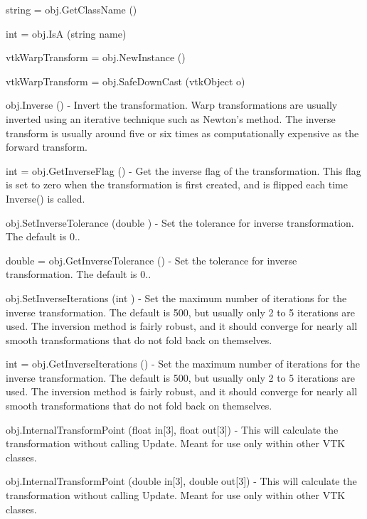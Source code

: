 \begin{DoxyItemize}
\item {\ttfamily string = obj.\-Get\-Class\-Name ()}  
\item {\ttfamily int = obj.\-Is\-A (string name)}  
\item {\ttfamily vtk\-Warp\-Transform = obj.\-New\-Instance ()}  
\item {\ttfamily vtk\-Warp\-Transform = obj.\-Safe\-Down\-Cast (vtk\-Object o)}  
\item {\ttfamily obj.\-Inverse ()} -\/ Invert the transformation. Warp transformations are usually inverted using an iterative technique such as Newton's method. The inverse transform is usually around five or six times as computationally expensive as the forward transform.  
\item {\ttfamily int = obj.\-Get\-Inverse\-Flag ()} -\/ Get the inverse flag of the transformation. This flag is set to zero when the transformation is first created, and is flipped each time Inverse() is called.  
\item {\ttfamily obj.\-Set\-Inverse\-Tolerance (double )} -\/ Set the tolerance for inverse transformation. The default is 0..  
\item {\ttfamily double = obj.\-Get\-Inverse\-Tolerance ()} -\/ Set the tolerance for inverse transformation. The default is 0..  
\item {\ttfamily obj.\-Set\-Inverse\-Iterations (int )} -\/ Set the maximum number of iterations for the inverse transformation. The default is 500, but usually only 2 to 5 iterations are used. The inversion method is fairly robust, and it should converge for nearly all smooth transformations that do not fold back on themselves.  
\item {\ttfamily int = obj.\-Get\-Inverse\-Iterations ()} -\/ Set the maximum number of iterations for the inverse transformation. The default is 500, but usually only 2 to 5 iterations are used. The inversion method is fairly robust, and it should converge for nearly all smooth transformations that do not fold back on themselves.  
\item {\ttfamily obj.\-Internal\-Transform\-Point (float in\mbox{[}3\mbox{]}, float out\mbox{[}3\mbox{]})} -\/ This will calculate the transformation without calling Update. Meant for use only within other V\-T\-K classes.  
\item {\ttfamily obj.\-Internal\-Transform\-Point (double in\mbox{[}3\mbox{]}, double out\mbox{[}3\mbox{]})} -\/ This will calculate the transformation without calling Update. Meant for use only within other V\-T\-K classes.  

\end{DoxyItemize}
